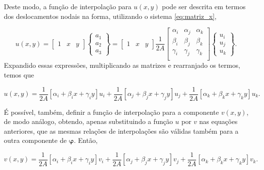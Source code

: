 Deste modo, a função de interpolação para $u(x,y)$ pode ser descrita em termos dos deslocamentos nodais na forma, utilizando o sistema \ref{eq:matriz_x},

\begin{equation}
    u(x,y) = \begin{bmatrix}
        1 & x & y
    \end{bmatrix} 
    \begin{Bmatrix}
        a_1 \\ a_2 \\ a_3
    \end{Bmatrix} = \begin{bmatrix}
        1 & x & y
    \end{bmatrix}  \frac{1}{2A}
    \begin{bmatrix}
        \alpha_i & \alpha_j & \alpha_k \\
        \beta_i & \beta_j & \beta_k \\
        \gamma_i & \gamma_j & \gamma_k \\
    \end{bmatrix}
    \begin{Bmatrix}
        u_i \\ u_j \\ u_k
    \end{Bmatrix}.
\end{equation}
Expandido essas expressões, multiplicando as matrizes e rearranjado os termos, temos que

\begin{equation}
    u(x,y) = \frac{1}{2A} \left[ \alpha_i + \beta_i x + \gamma_i y \right] u_i + \frac{1}{2A} \left[ \alpha_j + \beta_j x + \gamma_j y \right] u_j + \frac{1}{2A} \left[ \alpha_k + \beta_k x + \gamma_k y \right] u_k.
    \label{eq:funcao_u}
\end{equation}

É possível, também, definir a função de interpolação para a componente $v(x,y)$, de modo análogo, obtendo, apenas substituindo a função $u$ por $v$ nas equações anteriores, que as mesmas relações de interpolações são válidas também para a outra componente de $\bm{\varphi}$. Então, 

\begin{equation}
    v(x,y) = \frac{1}{2A} \left[ \alpha_i + \beta_i x + \gamma_i y \right] v_i + \frac{1}{2A} \left[ \alpha_j + \beta_j x + \gamma_j y \right] v_j + \frac{1}{2A} \left[ \alpha_k + \beta_k x + \gamma_k y \right] v_k.
    \label{eq:funcao_v}
\end{equation}

